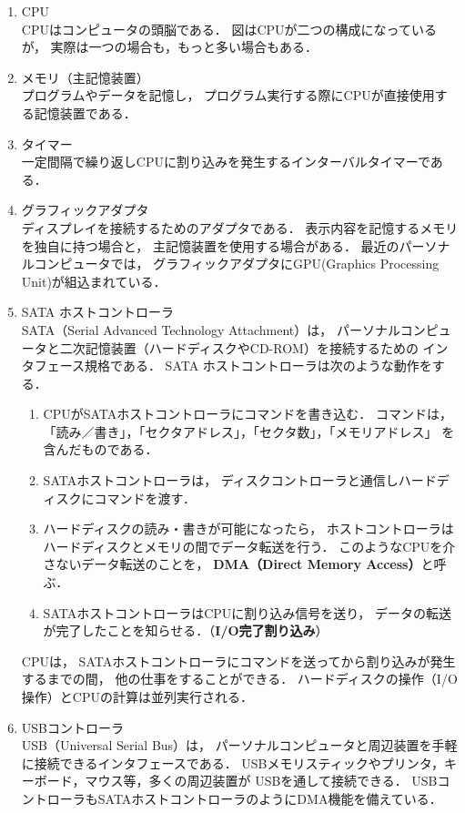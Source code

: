 \begin{enumerate}
\item CPU \\
CPUはコンピュータの頭脳である．
図はCPUが二つの構成になっているが，
実際は一つの場合も，もっと多い場合もある．

\item メモリ（主記憶装置） \\
プログラムやデータを記憶し，
プログラム実行する際にCPUが直接使用する記憶装置である．

\item タイマー \\
一定間隔で繰り返しCPUに割り込みを発生するインターバルタイマーである．

\item グラフィックアダプタ \\
ディスプレイを接続するためのアダプタである．
表示内容を記憶するメモリを独自に持つ場合と，
主記憶装置を使用する場合がある．
最近のパーソナルコンピュータでは，
グラフィックアダプタにGPU(Graphics Processing Unit)が組込まれている．

\item SATA ホストコントローラ　\\
SATA（Serial Advanced Technology Attachment）は，
パーソナルコンピュータと二次記憶装置（ハードディスクやCD-ROM）を接続するための
インタフェース規格である．
SATA ホストコントローラは次のような動作をする．
\begin{enumerate}
\item CPUがSATAホストコントローラにコマンドを書き込む．
コマンドは，
「読み／書き」，「セクタアドレス」，「セクタ数」，「メモリアドレス」
を含んだものである．
\item SATAホストコントローラは，
ディスクコントローラと通信しハードディスクにコマンドを渡す．
\item ハードディスクの読み・書きが可能になったら，
ホストコントローラはハードディスクとメモリの間でデータ転送を行う．
このようなCPUを介さないデータ転送のことを，
{\bf DMA（Direct Memory Access）}\label{dma}と呼ぶ．
\item SATAホストコントローラはCPUに割り込み信号を送り，
データの転送が完了したことを知らせる．（{\bf I/O完了割り込み}）
\end{enumerate}
CPUは，
SATAホストコントローラにコマンドを送ってから割り込みが発生するまでの間，
他の仕事をすることができる．
ハードディスクの操作（I/O操作）とCPUの計算は並列実行される．

\item USBコントローラ \\
USB（Universal Serial Bus）は，
パーソナルコンピュータと周辺装置を手軽に接続できるインタフェースである．
USBメモリスティックやプリンタ，キーボード，マウス等，多くの周辺装置が
USBを通して接続できる．
USBコントローラもSATAホストコントローラのようにDMA機能を備えている．


\end{enumerate}
